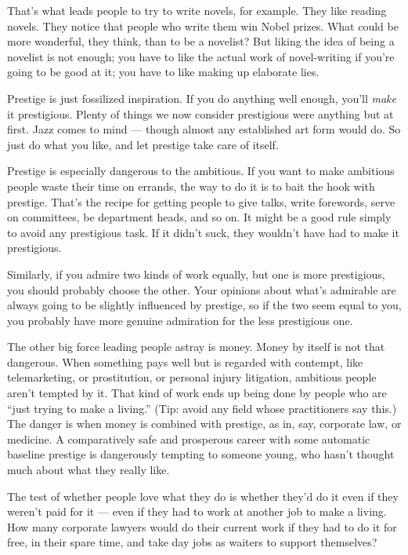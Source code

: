 That's what leads people to try to write novels, for example. They like
reading novels. They notice that people who write them win Nobel prizes.
What could be more wonderful, they think, than to be a novelist? But
liking the idea of being a novelist is not enough; you have to like the
actual work of novel-writing if you're going to be good at it; you have
to like making up elaborate lies.

Prestige is just fossilized inspiration. If you do anything well enough,
you'll \emph{make} it prestigious. Plenty of things we now consider
prestigious were anything but at first. Jazz comes to mind --- though
almost any established art form would do. So just do what you like, and
let prestige take care of itself.

Prestige is especially dangerous to the ambitious. If you want to make
ambitious people waste their time on errands, the way to do it is to
bait the hook with prestige. That's the recipe for getting people to
give talks, write forewords, serve on committees, be department heads,
and so on. It might be a good rule simply to avoid any prestigious task.
If it didn't suck, they wouldn't have had to make it prestigious.

Similarly, if you admire two kinds of work equally, but one is more
prestigious, you should probably choose the other. Your opinions about
what's admirable are always going to be slightly influenced by prestige,
so if the two seem equal to you, you probably have more genuine
admiration for the less prestigious one.

The other big force leading people astray is money. Money by itself is
not that dangerous. When something pays well but is regarded with
contempt, like telemarketing, or prostitution, or personal injury
litigation, ambitious people aren't tempted by it. That kind of work
ends up being done by people who are ``just trying to make a living.''
(Tip: avoid any field whose practitioners say this.) The danger is when
money is combined with prestige, as in, say, corporate law, or medicine.
A comparatively safe and prosperous career with some automatic baseline
prestige is dangerously tempting to someone young, who hasn't thought
much about what they really like.

The test of whether people love what they do is whether they'd do it
even if they weren't paid for it --- even if they had to work at another
job to make a living. How many corporate lawyers would do their current
work if they had to do it for free, in their spare time, and take day
jobs as waiters to support themselves?

